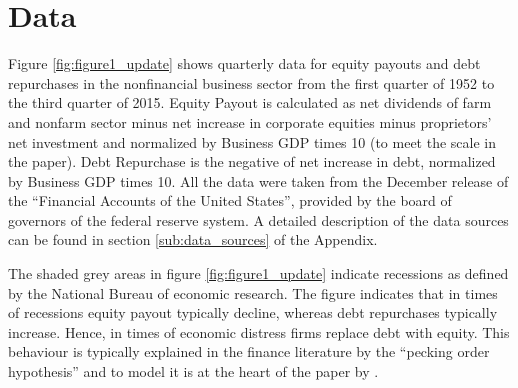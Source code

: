 \section{Data}
\label{sec:data}

Figure \ref{fig:figure1_update} shows quarterly data for equity payouts and
debt repurchases in the nonfinancial business sector from the first quarter of
1952 to the third quarter of 2015. Equity Payout is calculated as net
dividends of farm and nonfarm sector minus net increase in corporate equities
minus proprietors’ net investment and normalized by Business GDP times 10 (to
meet the scale in the paper). Debt Repurchase is the negative of net increase in
debt, normalized by Business GDP times 10. All the data were taken from the
December release of the ``Financial Accounts of the United States'', provided
by the board of governors of the federal reserve system. A detailed description
of the data sources can be found in section \ref{sub:data_sources} of the
Appendix. 



The shaded grey areas in figure \ref{fig:figure1_update} indicate recessions as
defined by the National Bureau of economic research. The figure indicates that
in times of recessions equity payout typically decline, whereas debt
repurchases typically increase. Hence, in times of economic distress firms
replace debt with equity. This behaviour is typically explained in the finance
literature by the ``pecking order hypothesis'' \parencite{myers_capital_1984} and to
model it is at the heart of the paper by \textcite{jerman_macroeconomic_2012}.
